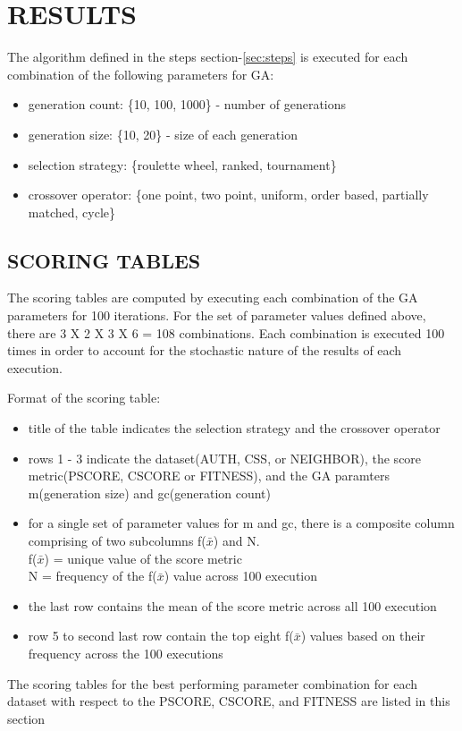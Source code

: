 \documentclass[12pt,a4paper]{article}
\begin{document}
	\section{\large RESULTS}
		The algorithm defined in the steps section-\ref{sec:steps} is executed for each combination of the following parameters for GA:
		\begin{itemize}
			\item generation count: \{10, 100, 1000\} - number of generations
			\item generation size: \{10, 20\} - size of each generation
			\item selection strategy: \{roulette wheel, ranked, tournament\}
			\item crossover operator: \{one point, two point, uniform, order based, partially matched, cycle\}
		\end{itemize}
 
	\subsection{SCORING TABLES}
	The scoring tables are computed by executing each combination of the GA parameters for 100 iterations.
	For the set of parameter values defined above, there are 3 X 2 X 3 X 6 = 108 combinations. Each combination is executed 100 times in order to account for the stochastic nature of the results of each execution. \par
	Format of the scoring table:
	\begin{itemize}
		\item title of the table indicates the selection strategy and the crossover operator
		\item rows 1 - 3 indicate the dataset(AUTH, CSS, or NEIGHBOR), the score metric(PSCORE, CSCORE or FITNESS), and the GA paramters m(generation size) and gc(generation count)
		\item for a single set of parameter values for m and gc, there is a composite column comprising of two subcolumns f($\bar{x}$) and N. \\
		f($\bar{x}$) = unique value of the score metric \\
		N = frequency of the f($\bar{x}$) value across 100 execution
		\item the last row contains the mean of the score metric across all 100 execution
		\item row 5 to second last row contain the top eight f($\bar{x}$) values based on their frequency across the 100 executions
	\end{itemize}
	The scoring tables for the best performing parameter combination for each dataset with respect to the PSCORE, CSCORE, and FITNESS are listed in this section
\end{document}
